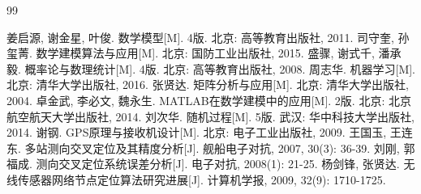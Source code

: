 
\newpage
\begin{thebibliography}{99}

 姜启源, 谢金星, 叶俊. 数学模型[M]. 4版. 北京: 高等教育出版社, 2011.
 司守奎, 孙玺菁. 数学建模算法与应用[M]. 北京: 国防工业出版社, 2015.
 盛骤, 谢式千, 潘承毅. 概率论与数理统计[M]. 4版. 北京: 高等教育出版社, 2008.
 周志华. 机器学习[M]. 北京: 清华大学出版社, 2016.
 张贤达. 矩阵分析与应用[M]. 北京: 清华大学出版社, 2004.
 卓金武, 李必文, 魏永生. MATLAB在数学建模中的应用[M]. 2版. 北京: 北京航空航天大学出版社, 2014.
 刘次华. 随机过程[M]. 5版. 武汉: 华中科技大学出版社, 2014.
 谢钢. GPS原理与接收机设计[M]. 北京: 电子工业出版社, 2009.
 王国玉, 王连东. 多站测向交叉定位及其精度分析[J]. 舰船电子对抗, 2007, 30(3): 36-39.
 刘刚, 郭福成. 测向交叉定位系统误差分析[J]. 电子对抗, 2008(1): 21-25.
 杨剑锋, 张贤达. 无线传感器网络节点定位算法研究进展[J]. 计算机学报, 2009, 32(9): 1710-1725.

\end{thebibliography}
